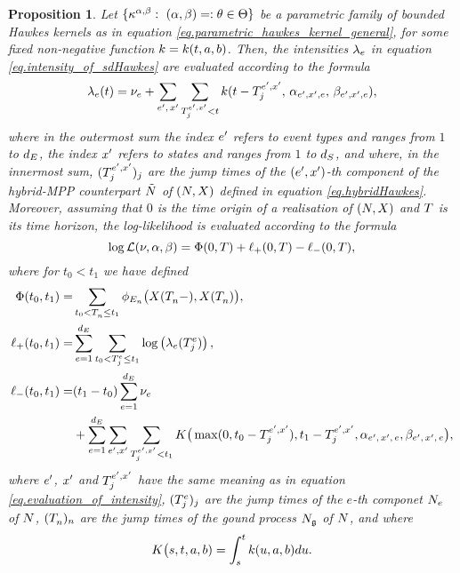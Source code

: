 \documentclass[10pt, article,table]{article}
\newtheorem{prop}[thm]{Proposition}
\begin{document}
\begin{prop}\label{prop.parametric_hawkes_kernels}
 Let $\lbrace\hawkesKernel^{\impCoef, \decCoef} : \, \, (\impCoef,\decCoef)=:\theta \in \Theta \rbrace$ be a parametric family of bounded Hawkes kernels as in equation \eqref{eq.parametric_hawkes_kernel_general}, for some fixed non-negative function $\parametricHawkesKernel=\parametricHawkesKernel(t,a,b)$. Then, the intensities $\intensity[e]$ in equation \eqref{eq.intensity_of_sdHawkes} are evaluated according to the formula
 \begin{equation}\label{eq.evaluation_of_intensity}
 \intensity(t) = \baseRate_e 
 +\sum_{\eone, \, \xone} \sum_{\arrivalTimes[\eone, \xone]_{j} < t} 
 \parametricHawkesKernel(t-\arrivalTimes[\eone, \xone]_{j}, \, \impCoef_{\eone,\xone, e}, \,  \decCoef_{\eone,\xone, e}),
\end{equation}
where in the outermost sum the index $\eone$ refers to event types and ranges from $1$ to $\numEventTypes$, the index $\xone$ refers to states and ranges from $1$ to $\numStates$, and where, in the innermost sum, $(\arrivalTimes[\eone, \xone]_{j})_j$ are the jump times of the $(\eone, \xone)$-th component of the hybrid-MPP counterpart $\hybridHawkes$ of $(\multiCountingProc,\stateVariable)$ defined in equation \eqref{eq.hybridHawkes}. Moreover, assuming that $0$ is the time origin of a realisation of $(\multiCountingProc, \stateVariable)$ and $\timeHorizon$ is its time horizon,  the log-likelihood is evaluated according to the formula
\begin{equation}\label{eq.evaluation_of_loglikelihood}
 \log \likelihood(\baseRate,\impCoef,\decCoef) = \Phi(0,\timeHorizon)
 + \lplus(0,\timeHorizon) - \lminus(0,\timeHorizon), 
\end{equation}
where for $t_0 < t_1$ we have defined
\begin{equation*}
\begin{split}
 \Phi(t_0,t_1) =& \sum_{t_0<\arrivalTimes[]_n \leq t_1} \transProb_{\event}\big(\stateVariable(\arrivalTimes[]_n - ), \stateVariable(\arrivalTimes[]_n)\big), 
 \\
 \lplus(t_0,t_1) =& \sum_{e=1}^{\numEventTypes} \sum_{t_0<\arrivalTimes[e]_j\leq t_1} \log \left(\intensity[e](\arrivalTimes[e]_j)\right), 
 \\
 \lminus(t_0,t_1) =& (t_1-t_0)\sum_{e=1}^{\numEventTypes} \baseRate_e
 \\
 & +\sum_{e=1}^{\numEventTypes} 
 \sum_{\eone,\xone} \sum_{\arrivalTimes[\eone,\xone]_j < t_1}
 K\big(\max(0,t_0-\arrivalTimes[\eone,\xone]_j), t_1 - \arrivalTimes[\eone,\xone]_j,  \impCoef\subscriptexe, \decCoef\subscriptexe\big),
\end{split}
 \end{equation*}
where $\eone$, $\xone$ and $\arrivalTimes[\eone,\xone]_j$ have the same meaning as in equation \eqref{eq.evaluation_of_intensity}, $(\arrivalTimes[e]_j)_j$ are the jump times of the $e$-th componet $\countingProc$ of $\multiCountingProc$, $(\arrivalTimes[]_n)_n$ are the jump times of the gound process $\groundProc$ of  $\multiCountingProc$, and where 
\begin{equation*}
 K\big(s,t, a, b) = \int_{s}^{t} \parametricHawkesKernel(u,a,b)du.
\end{equation*}
\end{prop}
\end{document}

